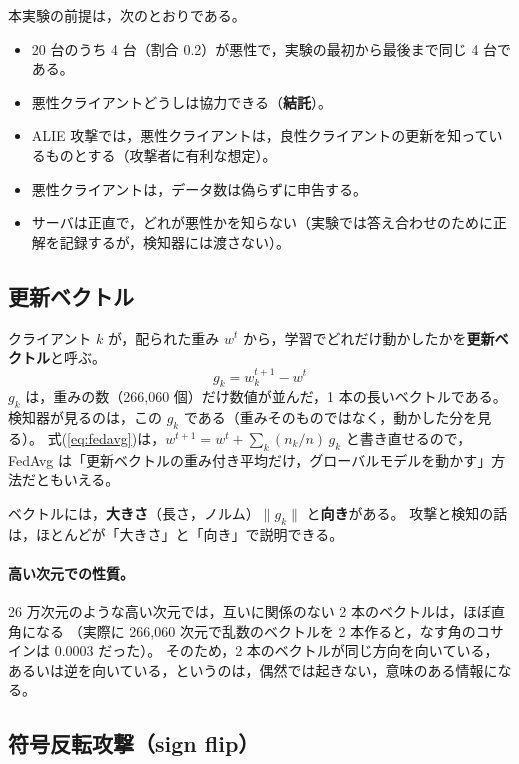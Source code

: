 \documentclass[a4j, dvipdfmx]{jsarticle}  %
\begin{document}
本実験の前提は，次のとおりである。

\begin{itemize}
  \item 20 台のうち 4 台（割合 0.2）が悪性で，実験の最初から最後まで同じ 4 台である。
  \item 悪性クライアントどうしは協力できる（\textbf{結託}）。
  \item ALIE 攻撃では，悪性クライアントは，良性クライアントの更新を知っているものとする（攻撃者に有利な想定）。
  \item 悪性クライアントは，データ数は偽らずに申告する。
  \item サーバは正直で，どれが悪性かを知らない（実験では答え合わせのために正解を記録するが，検知器には渡さない）。
\end{itemize}

\subsection{更新ベクトル}
\label{sec:update-vector}

クライアント $k$ が，配られた重み $w^t$ から，学習でどれだけ動かしたかを\textbf{更新ベクトル}と呼ぶ。
\begin{equation}
  g_k = w_k^{t+1} - w^t
  \label{eq:update}
\end{equation}
$g_k$ は，重みの数（266{,}060 個）だけ数値が並んだ，1 本の長いベクトルである。
検知器が見るのは，この $g_k$ である（重みそのものではなく，動かした分を見る）。
式(\ref{eq:fedavg})は，$w^{t+1} = w^t + \sum_k (n_k/n)\, g_k$ と書き直せるので，
FedAvg は「更新ベクトルの重み付き平均だけ，グローバルモデルを動かす」方法だともいえる。

ベクトルには，\textbf{大きさ}（長さ，ノルム）$\|g_k\|$ と\textbf{向き}がある。
攻撃と検知の話は，ほとんどが「大きさ」と「向き」で説明できる。

\paragraph{高い次元での性質。}
26 万次元のような高い次元では，互いに関係のない 2 本のベクトルは，ほぼ直角になる
（実際に 266{,}060 次元で乱数のベクトルを 2 本作ると，なす角のコサインは 0.0003 だった）。
そのため，2 本のベクトルが同じ方向を向いている，あるいは逆を向いている，というのは，偶然では起きない，意味のある情報になる。

\subsection{符号反転攻撃（sign flip）}
\end{document}
